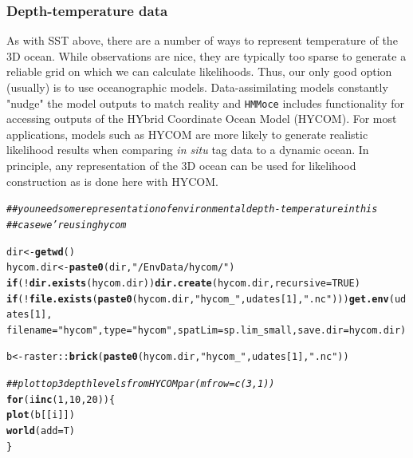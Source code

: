 \documentclass{article}\usepackage[]{graphicx}\usepackage[]{color}
\makeatletter
\newcommand{\hlnum}[1]{\textcolor[rgb]{0.686,0.059,0.569}{#1}}%
\newcommand{\hlstr}[1]{\textcolor[rgb]{0.192,0.494,0.8}{#1}}%
\newcommand{\hlcom}[1]{\textcolor[rgb]{0.678,0.584,0.686}{\textit{#1}}}%
\newcommand{\hlopt}[1]{\textcolor[rgb]{0,0,0}{#1}}%
\newcommand{\hlstd}[1]{\textcolor[rgb]{0.345,0.345,0.345}{#1}}%
\newcommand{\hlkwa}[1]{\textcolor[rgb]{0.161,0.373,0.58}{\textbf{#1}}}%
\newcommand{\hlkwb}[1]{\textcolor[rgb]{0.69,0.353,0.396}{#1}}%
\newcommand{\hlkwc}[1]{\textcolor[rgb]{0.333,0.667,0.333}{#1}}%
\newcommand{\hlkwd}[1]{\textcolor[rgb]{0.737,0.353,0.396}{\textbf{#1}}}%
\newenvironment{kframe}{%
 \def\at@end@of@kframe{}%
 \ifinner\ifhmode%
  \def\at@end@of@kframe{\end{minipage}}%
  \begin{minipage}{\columnwidth}%
 \fi\fi%
 \def\FrameCommand##1{\hskip\@totalleftmargin \hskip-\fboxsep
 \colorbox{shadecolor}{##1}\hskip-\fboxsep
     \hskip-\linewidth \hskip-\@totalleftmargin \hskip\columnwidth}%
 \MakeFramed {\advance\hsize-\width
   \@totalleftmargin\z@ \linewidth\hsize
   \@setminipage}}%
 {\par\unskip\endMakeFramed%
 \at@end@of@kframe}
\newenvironment{knitrout}{}{} %
\makeatother
\begin{document}
\subsubsection{Depth-temperature data}

As with SST above, there are a number of ways to represent temperature of the 3D ocean. While observations are nice, they are typically too sparse to generate a reliable grid on which we can calculate likelihoods. Thus, our only good option (usually) is to use oceanographic models. Data-assimilating models constantly "nudge" the model outputs to match reality and \texttt{HMMoce} includes functionality for accessing outputs of the HYbrid Coordinate Ocean Model (HYCOM). For most applications, models such as HYCOM are more likely to generate realistic likelihood results when comparing \textit{in situ} tag data to a dynamic ocean. In principle, any representation of the 3D ocean can be used for likelihood construction as is done here with HYCOM.

\begin{knitrout}\small
{}\color{fgcolor}\begin{kframe}
\begin{alltt}
\hlcom{## you need some representation of environmental depth-temperature in this}
\hlcom{## case we're using hycom}

\hlstd{dir} \hlkwb{<-} \hlkwd{getwd}\hlstd{()}
\hlstd{hycom.dir} \hlkwb{<-} \hlkwd{paste0}\hlstd{(dir,} \hlstr{"/EnvData/hycom/"}\hlstd{)}
\hlkwa{if} \hlstd{(}\hlopt{!}\hlkwd{dir.exists}\hlstd{(hycom.dir))} \hlkwd{dir.create}\hlstd{(hycom.dir,} \hlkwc{recursive} \hlstd{=} \hlnum{TRUE}\hlstd{)}
\hlkwa{if} \hlstd{(}\hlopt{!}\hlkwd{file.exists}\hlstd{(}\hlkwd{paste0}\hlstd{(hycom.dir,} \hlstr{"hycom_"}\hlstd{, udates[}\hlnum{1}\hlstd{],} \hlstr{".nc"}\hlstd{)))} \hlkwd{get.env}\hlstd{(udates[}\hlnum{1}\hlstd{],}
    \hlkwc{filename} \hlstd{=} \hlstr{"hycom"}\hlstd{,} \hlkwc{type} \hlstd{=} \hlstr{"hycom"}\hlstd{,} \hlkwc{spatLim} \hlstd{= sp.lim_small,} \hlkwc{save.dir} \hlstd{= hycom.dir)}

\hlstd{b} \hlkwb{<-} \hlstd{raster}\hlopt{::}\hlkwd{brick}\hlstd{(}\hlkwd{paste0}\hlstd{(hycom.dir,} \hlstr{"hycom_"}\hlstd{, udates[}\hlnum{1}\hlstd{],} \hlstr{".nc"}\hlstd{))}

\hlcom{## plot top 3 depth levels from HYCOM par(mfrow=c(3,1))}
\hlkwa{for} \hlstd{(i} \hlkwa{in} \hlkwd{c}\hlstd{(}\hlnum{1}\hlstd{,} \hlnum{10}\hlstd{,} \hlnum{20}\hlstd{)) \{}
    \hlkwd{plot}\hlstd{(b[[i]])}
    \hlkwd{world}\hlstd{(}\hlkwc{add} \hlstd{= T)}
\hlstd{\}}
\end{alltt}
\end{kframe}
\end{knitrout}
\end{document}
